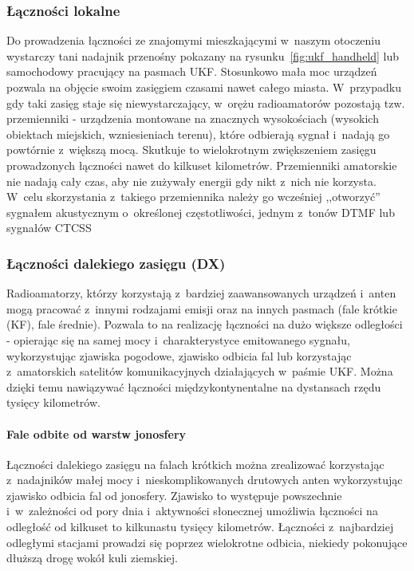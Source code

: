 \documentclass[eng,oneside]{mgr}
\begin{document}
				\subsubsection{Łączności lokalne}
				Do prowadzenia łączności ze znajomymi mieszkającymi w~naszym otoczeniu wystarczy tani nadajnik przenośny pokazany na rysunku~\ref{fig:ukf_handheld} lub samochodowy pracujący na pasmach UKF. Stosunkowo mała moc urządzeń pozwala na objęcie swoim zasięgiem czasami nawet całego miasta. W~przypadku gdy taki zasięg staje się niewystarczający, w~orężu radioamatorów pozostają tzw. przemienniki - urządzenia montowane na znacznych wysokościach (wysokich obiektach miejskich, wzniesieniach terenu), które odbierają sygnał i~nadają go powtórnie z~większą mocą. Skutkuje to wielokrotnym zwiększeniem zasięgu prowadzonych łączności nawet do kilkuset kilometrów. Przemienniki amatorskie nie nadają cały czas, aby nie zużywały energii gdy nikt z~nich nie korzysta. W~celu skorzystania z~takiego przemiennika należy go wcześniej ,,otworzyć'' sygnałem akustycznym o~określonej częstotliwości, jednym z~tonów DTMF lub sygnałów CTCSS

				\subsubsection{Łączności dalekiego zasięgu (DX)}
				Radioamatorzy, którzy korzystają z~bardziej zaawansowanych urządzeń i~anten mogą pracować z~innymi rodzajami emisji oraz na innych pasmach (fale krótkie (KF), fale średnie). Pozwala to na realizację łączności na dużo większe odległości - opierając się na samej mocy i~charakterystyce emitowanego sygnału, wykorzystując zjawiska pogodowe, zjawisko odbicia fal lub korzystając z~amatorskich satelitów komunikacyjnych działających w~paśmie UKF. Można dzięki temu nawiązywać łączności międzykontynentalne na dystansach rzędu tysięcy kilometrów.
					
					\paragraph{Fale odbite od warstw jonosfery}
					Łączności dalekiego zasięgu na falach krótkich można zrealizować korzystając z~nadajników małej mocy i~nieskomplikowanych drutowych anten wykorzystując zjawisko odbicia fal od jonosfery. Zjawisko to występuje powszechnie i~w~zależności od pory dnia i~aktywności słonecznej umożliwia łączności na odległość od kilkuset to kilkunastu tysięcy kilometrów. Łączności z~najbardziej odległymi stacjami prowadzi się poprzez wielokrotne odbicia, niekiedy pokonujące dłuższą drogę wokół kuli ziemskiej.
\end{document}
